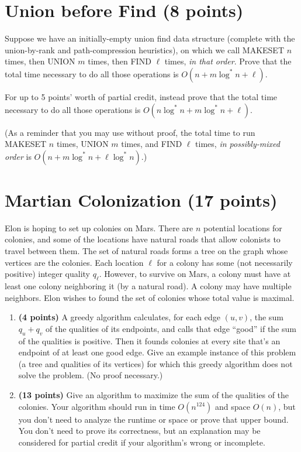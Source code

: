 \documentclass[11pt]{article}
\begin{document}
\newpage

\section{Union before Find (8 points)}
Suppose we have an initially-empty union find data structure (complete with the union-by-rank and path-compression heuristics), on which we call MAKESET $n$ times, then UNION $m$ times, then FIND $\ell$ times, \emph{in that order}. Prove that the total time necessary to do all those operations is $O(n + m \log^* n + \ell)$. 

For up to 5 points' worth of partial credit, instead prove that the total time necessary to do all those operations is $O(n \log^* n + m \log^* n + \ell)$.

(As a reminder that you may use without proof, the total time to run MAKESET $n$ times, UNION $m$ times, and FIND $\ell$ times, \emph{in possibly-mixed order} is $O(n + m \log^* n + \ell \log^* n)$.)

\newpage
\section{Martian Colonization (17 points)}
Elon is hoping to set up colonies on Mars. There are $n$ potential locations for colonies, and some of the locations have natural roads that allow colonists to travel between them. The set of natural roads forms a tree on the graph whose vertices are the colonies.
Each location $\ell$ for a colony has some (not necessarily positive) integer quality $q_\ell$. However, to survive on Mars, a colony must have at least one colony neighboring it (by a natural road). A colony may have multiple neighbors. Elon wishes to found the set of colonies whose total value is maximal.
\begin{enumerate}
\item {\bf (4 points)} 
A greedy algorithm calculates, for each edge $(u,v)$, the sum $q_u + q_v$ of the qualities of its endpoints, and calls that edge ``good'' if the sum of the qualities is positive. Then it founds colonies at every site that's an endpoint of at least one good edge. Give an example instance of this problem (a tree and qualities of its vertices) for which this greedy algorithm does not solve the problem. (No proof necessary.)

\vfill

\item {\bf (13 points)} Give an algorithm to maximize the sum of the qualities of the colonies. Your algorithm should run in time $O(n^{124})$ and space $O(n)$, but you don't need to analyze the runtime or space or prove that upper bound. You don't need to prove its correctness, but an explanation may be considered for partial credit if your algorithm's wrong or incomplete.

\vfill

\vfill
\end{enumerate}
\end{document}

